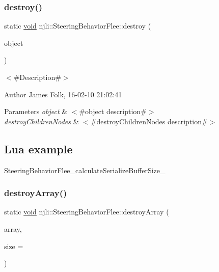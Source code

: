 \subsubsection{\texorpdfstring{destroy()}{destroy()}}
{\footnotesize\ttfamily static \mbox{\hyperlink{_thread_8h_af1e856da2e658414cb2456cb6f7ebc66}{void}} njli\+::\+Steering\+Behavior\+Flee\+::destroy (\begin{DoxyParamCaption}\item[{\mbox{\hyperlink{classnjli_1_1_steering_behavior_flee}{Steering\+Behavior\+Flee}} $\ast$}]{object }\end{DoxyParamCaption})\hspace{0.3cm}{\ttfamily [static]}}



$<$\#\+Description\#$>$ 

\begin{DoxyAuthor}{Author}
James Folk, 16-\/02-\/10 21\+:02\+:41
\end{DoxyAuthor}

\begin{DoxyParams}{Parameters}
{\em object} & $<$\#object description\#$>$ \\
\hline
{\em destroy\+Children\+Nodes} & $<$\#destroy\+Children\+Nodes description\#$>$\\
\hline
\end{DoxyParams}
\hypertarget{classnjli_1_1_steering_behavior_wander_ex1}{}\subsection{Lua example}\label{classnjli_1_1_steering_behavior_wander_ex1}

\begin{DoxyCodeInclude}
\end{DoxyCodeInclude}
Steering\+Behavior\+Flee\+\_\+calculate\+Serialize\+Buffer\+Size\+\_\+ \mbox{\label{classnjli_1_1_steering_behavior_flee_a9ac450b31fed9a4d9a92c6b5a8dfb6f0}} 
\subsubsection{\texorpdfstring{destroy\+Array()}{destroyArray()}}
{\footnotesize\ttfamily static \mbox{\hyperlink{_thread_8h_af1e856da2e658414cb2456cb6f7ebc66}{void}} njli\+::\+Steering\+Behavior\+Flee\+::destroy\+Array (\begin{DoxyParamCaption}\item[{\mbox{\hyperlink{classnjli_1_1_steering_behavior_flee}{Steering\+Behavior\+Flee}} $\ast$$\ast$}]{array,  }\item[{const \mbox{\hyperlink{_util_8h_a10e94b422ef0c20dcdec20d31a1f5049}{u32}}}]{size = {} }\end{DoxyParamCaption})\hspace{0.3cm}{\ttfamily [static]}}



